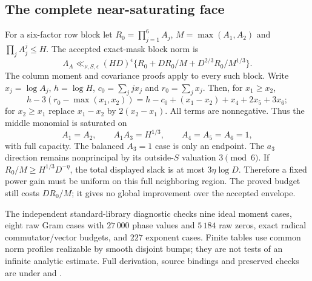 \documentclass[11pt,oneside,openany]{book}
\theoremstyle{definition}\newtheorem{definition}[theorem]{Definition}
\theoremstyle{remark}\newtheorem{remark}[theorem]{Remark}
\begin{document}
\subsection{The complete near-saturating face}
For a six-factor row block let $R_0=\prod_{j=1}^6A_j$,
$M=\max(A_1,A_2)$ and $\prod_j A_j^j\le H$.
The accepted exact-mask block norm is
\[
 \Lambda_A\ll_{\nu,S,\epsilon}(HD)^\epsilon
 \{R_0+DR_0/M+D^{2/3}R_0/M^{1/3}\}.
\]
The column moment and covariance proofs apply to every such block.
Write $x_j=\log A_j$, $h=\log H$, $c_0=\sum_jjx_j$ and
$r_0=\sum_jx_j$. Then, for $x_1\ge x_2$,
\[
 h-3(r_0-\max(x_1,x_2))
 =h-c_0+(x_1-x_2)+x_4+2x_5+3x_6;
\]
for $x_2\ge x_1$ replace $x_1-x_2$ by $2(x_2-x_1)$.
All terms are nonnegative. Thus the middle monomial is saturated on
\[
 A_1=A_2,\qquad A_1A_3=H^{1/3},\qquad A_4=A_5=A_6=1,
\]
with full capacity. The balanced $A_3=1$ case is only an endpoint.
The $a_3$ direction remains nonprincipal by its outside-$S$ valuation
$3\pmod6$. If $R_0/M\ge H^{1/3}D^{-\eta}$, the total displayed slack
is at most $3\eta\log D$. Therefore a fixed power gain must be uniform
on this full neighboring region. The proved budget still costs $DR_0/M$;
it gives no global improvement over the accepted envelope.

The independent standard-library diagnostic checks nine ideal moment
cases, eight raw Gram cases with $27\,000$ phase values and $5\,184$ raw
zeros, exact radical commutator/vector budgets, and $227$ exponent cases.
Finite tables use common norm profiles realizable by smooth disjoint bumps;
they are not tests of an infinite analytic estimate. Full derivation,
source bindings and preserved checks are under
 and
.
\end{document}
